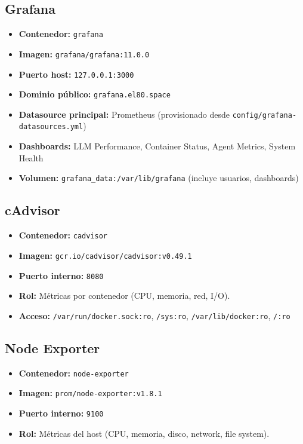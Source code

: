 \documentclass[11pt,a4paper]{article}
\newcommand{\dato}[2]{\textbf{\color{hermesblue}#1:} #2}
\begin{document}
\subsection{Grafana}

\begin{itemize}[leftmargin=*,itemsep=1pt]
\item \dato{Contenedor}{\texttt{grafana}}
\item \dato{Imagen}{\texttt{grafana/grafana:11.0.0}}
\item \dato{Puerto host}{\texttt{127.0.0.1:3000}}
\item \dato{Dominio público}{\texttt{grafana.el80.space}}
\item \dato{Datasource principal}{Prometheus (provisionado desde \texttt{config/grafana-datasources.yml})}
\item \dato{Dashboards}{LLM Performance, Container Status, Agent Metrics, System Health}
\item \dato{Volumen}{\texttt{grafana\_data:/var/lib/grafana} (incluye usuarios, dashboards)}
\end{itemize}

\subsection{cAdvisor}

\begin{itemize}[leftmargin=*,itemsep=1pt]
\item \dato{Contenedor}{\texttt{cadvisor}}
\item \dato{Imagen}{\texttt{gcr.io/cadvisor/cadvisor:v0.49.1}}
\item \dato{Puerto interno}{\texttt{8080}}
\item \dato{Rol}{Métricas por contenedor (CPU, memoria, red, I/O).}
\item \dato{Acceso}{\texttt{/var/run/docker.sock:ro}, \texttt{/sys:ro}, \texttt{/var/lib/docker:ro}, \texttt{/:ro}}
\end{itemize}

\subsection{Node Exporter}

\begin{itemize}[leftmargin=*,itemsep=1pt]
\item \dato{Contenedor}{\texttt{node-exporter}}
\item \dato{Imagen}{\texttt{prom/node-exporter:v1.8.1}}
\item \dato{Puerto interno}{\texttt{9100}}
\item \dato{Rol}{Métricas del host (CPU, memoria, disco, network, file system).}
\end{itemize}
\end{document}
